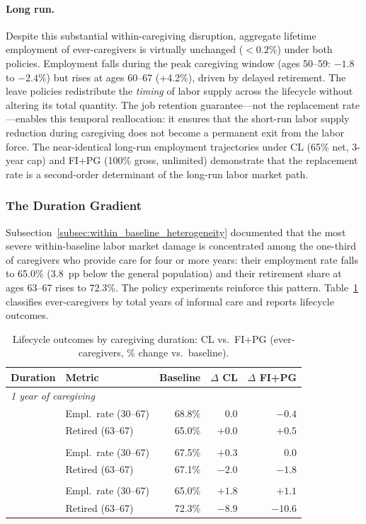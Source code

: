 \paragraph{Long run.} Despite this substantial within-caregiving disruption, aggregate lifetime employment of ever-caregivers is virtually unchanged ($<0.2\%$) under both policies. Employment falls during the peak caregiving window (ages 50--59: $-1.8$ to $-2.4\%$) but rises at ages 60--67 (+4.2\%), driven by delayed retirement. The leave policies redistribute the \textit{timing} of labor supply across the lifecycle without altering its total quantity. The job retention guarantee---not the replacement rate---enables this temporal reallocation: it ensures that the short-run labor supply reduction during caregiving does not become a permanent exit from the labor force. The near-identical long-run employment trajectories under CL (65\% net, 3-year cap) and FI+PG (100\% gross, unlimited) demonstrate that the replacement rate is a second-order determinant of the long-run labor market path.

\subsubsection{The Duration Gradient}

Subsection~\ref{subsec:within_baseline_heterogeneity} documented that the most severe within-baseline labor market damage is concentrated among the one-third of caregivers who provide care for four or more years: their employment rate falls to 65.0\% (3.8~pp below the general population) and their retirement share at ages 63--67 rises to 72.3\%. The policy experiments reinforce this pattern. Table~\ref{tab:main_duration} classifies ever-caregivers by total years of informal care and reports lifecycle outcomes.

\begin{table}[htbp]
  \centering
  \caption{Lifecycle outcomes by caregiving duration: CL vs.\ FI+PG (ever-caregivers, \% change vs.\ baseline).}
  \label{tab:main_duration}
  \small
  \begin{tabular}{llrrr}
    \toprule
    Duration & Metric & Baseline & $\Delta$ CL & $\Delta$ FI+PG \\
    \midrule
    \multicolumn{5}{l}{\textit{1 year of caregiving}} \\
    & Empl.\ rate (30--67) & 68.8\% & $0.0$ & $-0.4$ \\
    & Retired (63--67) & 65.0\% & $+0.0$ & $+0.5$ \\
    \addlinespace
    \multicolumn{5}{l}{\textit{2--3 years of caregiving}} \\
    & Empl.\ rate (30--67) & 67.5\% & $+0.3$ & $0.0$ \\
    & Retired (63--67) & 67.1\% & $-2.0$ & $-1.8$ \\
    \addlinespace
    \multicolumn{5}{l}{\textit{4+ years of caregiving}} \\
    & Empl.\ rate (30--67) & 65.0\% & $+1.8$ & $+1.1$ \\
    & Retired (63--67) & 72.3\% & $-8.9$ & $-10.6$ \\
    \bottomrule
  \end{tabular}
\end{table}

